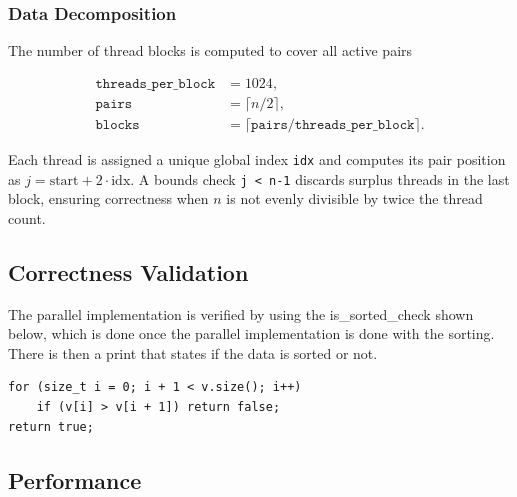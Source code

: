 \documentclass[11pt,a4paper]{article}
\begin{document}
\subsubsection{Data Decomposition}

The number of thread blocks is computed to cover all active pairs

\begin{align}
    \texttt{threads\_per\_block} &= 1024, \\
    \texttt{pairs} &= \lceil n/2 \rceil, \\
    \texttt{blocks} &= \lceil \texttt{pairs} / \texttt{threads\_per\_block} \rceil.
\end{align}

Each thread is assigned a unique global index \texttt{idx} and computes its pair position as $j = \text{start} + 2\cdot\text{idx}$. A bounds check \texttt{j < n-1} discards surplus threads in the last block, ensuring correctness when $n$ is not evenly divisible by twice the thread count.

\subsection{Correctness Validation}

The parallel implementation is verified by using the is\_sorted\_check shown below, which is done once the parallel implementation is done with the sorting. There is then a print that states if the data is sorted or not.

\begin{lstlisting}[caption={is\_sorted\_check}]
for (size_t i = 0; i + 1 < v.size(); i++)
    if (v[i] > v[i + 1]) return false;
return true;
\end{lstlisting}

\subsection{Performance}
\end{document}

